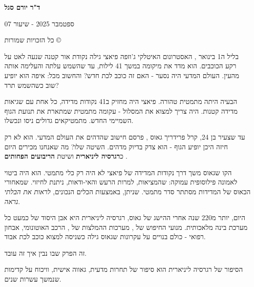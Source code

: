 

\noindent\textbf{}

\begin{center}
\textbf{ד"ר יורם סגל}

ספטמבר 2025 - שיעור 07

כל הזכויות שמורות \textenglish{©}
\end{center}

\vspace{0.5cm}


בליל ה\en{-}\num{1} בינואר , האסטרונום האיטלקי ג'וזפה פיאצי  גילה נקודת אור קטנה שנעה לאט על רקע הכוכבים. הוא מדד את מיקומה במשך \num{41} לילות, עד שהשמש עלתה והעלימה אותה מהעין. העולם המדעי היה נסער - האם זה כוכב לכת חדש? והחשוב מכל: איפה הוא יופיע שוב כשהשמש תרד?

הבעיה היתה מתמטית טהורה. פיאצי היה מחזיק ב\en{-}\num{41} נקודות מדידה, כל אחת עם שגיאות מדידה קטנות. היה צריך למצוא את המסלול - עקומה מתמטית שמתארת את תנועת הגוף השמיימי החדש. מתמטיקאים גדולים ניסו ונכשלו.

עד שצעיר בן \num{24}, קרל פרידריך גאוס , פרסם חישוב שהדהים את העולם המדעי. הוא לא רק חיזה היכן יופיע הגוף - הוא צדק בדיוק מדהים. השיטה שלו? מה שאנחנו מכירים היום כ\textbf{רגרסיה ליניארית} ושיטת \textbf{הריבועים הפחותים} .

הקו שגאוס משך דרך נקודות המדידה של פיאצי לא היה רק כלי מתמטי. הוא היה ביטוי לאמונה פילוסופית עמוקה: שהמציאות, למרות הרעש והאי-ודאות, ניתנת לחיזוי. שמאחורי הכאוס של המדידות מסתתר סדר מתמטי. שניתן, באמצעות הכלים הנכונים, \textit{לראות את הבלתי נראה}.

היום, יותר מ\en{-}\num{220} שנה אחרי ההישג של גאוס, רגרסיה ליניארית היא אבן היסוד של כמעט כל מערכת בינה מלאכותית. מנועי החיפוש של , מערכות ההמלצות של , הרכב האוטונומי, אבחון רפואי - כולם בנויים על עקרונות שגאוס גילה כשניסה למצוא כוכב לכת אבוד.

זה הפרק שבו נבין איך זה עובד.


הסיפור של רגרסיה ליניארית הוא סיפור של תחרות מדעית, גאווה אישית, וויכוח על קדימות שנמשך עשרות שנים.

